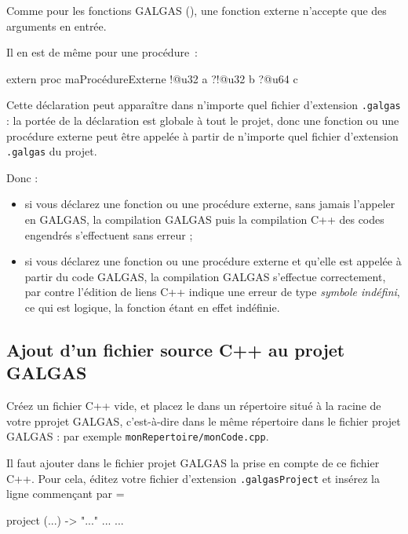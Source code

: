 Comme pour les fonctions GALGAS (), une fonction externe n'accepte que des arguments en entrée.

Il en est de même pour une procédure~:
\begin{galgas4}
extern proc maProcédureExterne !@u32 a ?!@u32 b ?@u64 c
\end{galgas4}

Cette déclaration peut apparaître dans n'importe quel fichier d'extension \texttt{.galgas} : la portée de la déclaration est globale à tout le projet, donc une fonction ou une procédure externe peut être appelée à partir de n'importe quel fichier d'extension \texttt{.galgas} du projet.

Donc :
\begin{itemize}
  \item si vous déclarez une fonction ou une procédure externe, sans jamais l'appeler en GALGAS, la compilation GALGAS puis la compilation C++ des codes engendrés s'effectuent sans erreur ;
  \item si vous déclarez  une fonction ou une procédure externe et qu'elle est appelée à partir du code GALGAS, la compilation GALGAS s'effectue correctement, par contre l'édition de liens C++ indique une erreur de type \emph{symbole indéfini}, ce qui est logique, la fonction étant en effet indéfinie.
\end{itemize}








\subsection{Ajout d'un fichier source C++ au projet GALGAS}


Créez un fichier C++ vide, et placez le dans un répertoire situé à la racine de votre pprojet GALGAS, c'est-à-dire dans le même répertoire dans le fichier projet GALGAS : par exemple \texttt{monRepertoire/monCode.cpp}.

Il faut ajouter dans le fichier projet GALGAS la prise en compte de ce fichier C++. Pour cela, éditez votre fichier d'extension \texttt{.galgasProject} et insérez la ligne commençant par \ggsq=%

\begin{galgas4}
project (...) -> "..." {
  ...
  ...
}
\end{galgas4}


